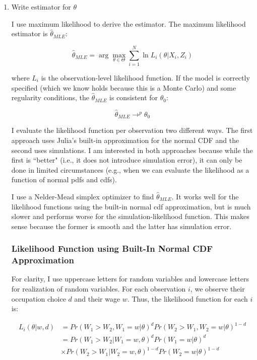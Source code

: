 \documentclass{article}
\begin{document}
\begin{enumerate}
\begin{enumerate}
\pagebreak

\item Write estimator for $\theta$

\bigskip

I use maximum likelihood to derive the estimator. The maximum likelihood estimator is $\hat\theta_{MLE}$:

$$
\hat \theta_{MLE} = \arg \max_{\theta \in \Theta} \sum_{i=1}^N \ln L_i(\theta|X_i, Z_i)
$$

where $L_i$ is the observation-level likelihood function. If the model is correctly specified (which we know holds because this is a Monte Carlo) and some regularity conditions, the $\hat\theta_{MLE}$ is consistent for $\theta_0$:

$$
\hat\theta_{MLE} \to^p \theta_0
$$


I evaluate the likelihood function per observation two different ways.  The first approach uses Julia's built-in approximation for the normal CDF and the second uses simulations. I am interested in both approaches because while the first is ``better" (i.e., it does not introduce simulation error), it can only be done in limited circumstances (e.g., when we can evaluate the likelihood as a function of normal pdfs and cdfs).

\bigskip

I use a Nelder-Mead simplex optimizer to find $\hat\theta_{MLE}$. It works well for the likelihood functions using the built-in normal cdf approximation, but is much slower and performs worse for the simulation-likelihood function.  This makes sense because the former is smooth and the latter has simulation error.

\subsubsection*{Likelihood Function using Built-In Normal CDF Approximation}

For clarity, I use uppercase letters for random variables and lowercase letters for realization of random variables.  For each observation $i$, we observe their occupation choice $d$ and their wage $w$. Thus, the likelihood function for each $i$ is:

\begin{align*}
L_i(\theta| w, d) 
&= 
Pr(W_1 > W_2 , W_1 = w | \theta)^{d} 
Pr(W_2 > W_1 , W_2 = w | \theta)^{1-d}\\
&= 
Pr(W_1 > W_2 | W_1 = w, \theta)^{d} 
Pr(W_1 = w|\theta)^{d} \\ 
&\times
Pr(W_2 > W_1 | W_2 = w, \theta)^{1-d} 
Pr(W_2 = w|\theta)^{1-d}
\end{align*}


\end{enumerate}
\end{enumerate}
\end{document}
